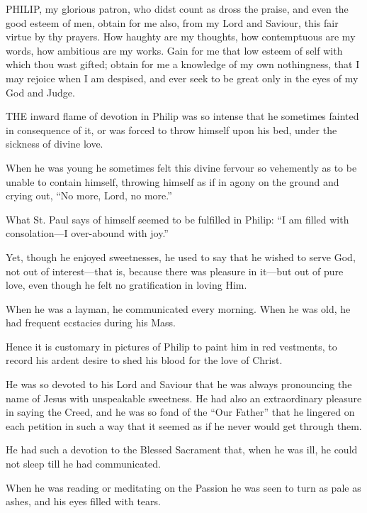 
PHILIP, my glorious
patron, who didst count as dross the praise, and even the good esteem of
men, obtain for me also, from my Lord and Saviour, this fair virtue by
thy prayers. How haughty are my thoughts, how contemptuous are my words,
how ambitious are my works. Gain for me that low esteem of self with
which thou wast gifted; obtain for me a knowledge of my own nothingness,
that I may rejoice when I am despised, and ever seek to be great only in
the eyes of my God and Judge.



THE inward flame of
devotion in Philip was so intense that he sometimes fainted in
consequence of it, or was forced to throw himself upon his bed, under
the sickness of divine love.

When he was young he sometimes
felt this divine fervour so vehemently as to be unable to contain
himself, throwing himself as if in agony on the ground and crying out, ``No
more, Lord, no more.''

What St. Paul says of himself
seemed to be fulfilled in Philip: ``I am filled with consolation—I
over-abound with joy.''

Yet, though he enjoyed
sweetnesses, he used to say that he wished to serve God, not out of
interest—that is, because there was pleasure in it—but out of pure
love, even though he felt no gratification in loving Him.

When he was a layman, he
communicated every morning. When he was old, he had frequent ecstacies
during his Mass.

Hence it is customary in
pictures of Philip to paint him in red vestments, to record his
ardent desire to shed his blood for the love of Christ.

He was so devoted to his Lord
and Saviour that he was always pronouncing the name of Jesus with
unspeakable sweetness. He had also an extraordinary pleasure in saying
the Creed, and he was so fond of the ``Our Father'' that he lingered on
each petition in such a way that it seemed as if he never would get
through them.

He had such a devotion to the
Blessed Sacrament that, when he was ill, he could not sleep till he had
communicated.

When he was reading or
meditating on the Passion he was seen to turn as pale as ashes, and his
eyes filled with tears.

